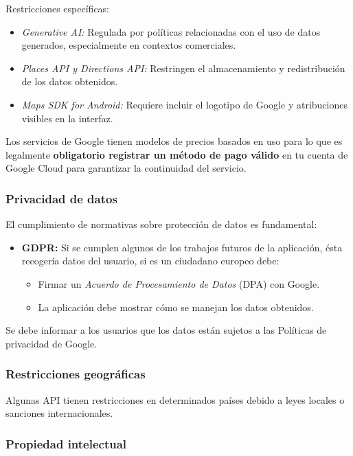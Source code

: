 Restricciones específicas:
\begin{itemize}
	\item \textit{Generative AI:} Regulada por políticas relacionadas con el uso de datos generados, especialmente en contextos comerciales.
	\item \textit{Places API y Directions API:} Restringen el almacenamiento y redistribución de los datos obtenidos.
	\item \textit{Maps SDK for Android:} Requiere incluir el logotipo de Google y atribuciones visibles en la interfaz.
\end{itemize}

Los servicios de Google tienen modelos de precios basados en uso para lo que es legalmente\textbf{ obligatorio registrar un método de pago válido} en tu cuenta de Google Cloud para garantizar la continuidad del servicio.

\subsubsection{Privacidad de datos}

El cumplimiento de normativas sobre protección de datos es fundamental:

\begin{itemize}
	\item \textbf{GDPR:} Si se cumplen algunos de los trabajos futuros de la aplicación, ésta recogería datos del usuario, si es un ciudadano europeo debe:
	\begin{itemize}
		\item Firmar un \textit{Acuerdo de Procesamiento de Datos} (DPA) con Google.
		\item La aplicación debe mostrar cómo se manejan los datos obtenidos.
	\end{itemize}
\end{itemize}

Se debe informar a los usuarios que los datos están sujetos a las Políticas de privacidad de Google.

\subsubsection{Restricciones geográficas}

Algunas API tienen restricciones en determinados países debido a leyes locales o sanciones internacionales. 


\subsubsection{Propiedad intelectual}

